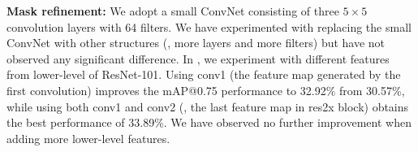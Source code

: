 \begin{table}[!t]
  \centering
  \caption{Effect of different numbers of directions (\ie, how many directions for quantizing the 360 degree) when using four bins for distance quantization.}
  \label{tab:direction_effect}
\end{table}






\textbf{Mask refinement:} We adopt a small ConvNet consisting of three $5\times5$ convolution layers with 64 filters. We have experimented with replacing the small ConvNet with other structures (\eg, more layers and more filters) but have not observed any significant difference. In , we experiment with different features from lower-level of ResNet-101. Using conv1 (the feature map generated by the first convolution) improves the mAP@0.75 performance to 32.92\% from 30.57\%, while using both conv1 and conv2 (\ie, the last feature map in res2x block) obtains the best performance of 33.89\%. We have observed no further improvement when adding more lower-level features.

\begin{table}[!t]
  \centering
  \caption{Mask refinement. The best performance is obtained when using features from conv1 and conv2 (\ie, last feature map in res2x block). Note conv3 denotes the last feature map in res3x block.}
  \label{tab:refine_mask}
\end{table}


